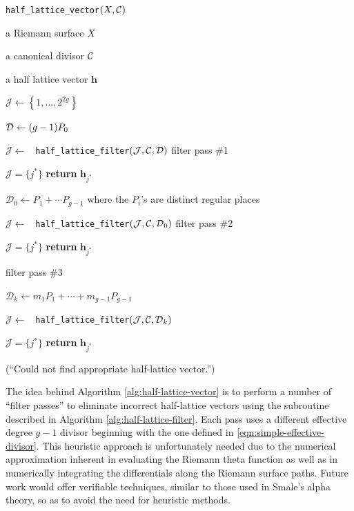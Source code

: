 \begin{algorithm}[t]
\caption{{\tt half\_lattice\_vector}$(X,\operatorname{\mathcal{C}})$}
\label{alg:half-lattice-vector}
\begin{algorithmic}[1]

\Require a Riemann surface $X$

\Require a canonical divisor $\operatorname{\mathcal{C}}$

\Ensure a half lattice vector $\boldsymbol{h}$

\State $\mathcal{J} \gets \left\{ 1, \ldots, 2^{2g} \right\}$

\State $\operatorname{\mathcal{D}} \gets (g-1)P_0$

\State $\mathcal{J} \gets$ {\tt
  half\_lattice\_filter}$(\mathcal{J},\operatorname{\mathcal{C}},\operatorname{\mathcal{D}})$ \Comment filter pass \#1

 $\mathcal{J} = \{j^*\}$ {\bf return} $\boldsymbol{h}_{j^*}$

\State $\mathcal{D}_0 \gets P_1 + \cdots P_{g-1}$ where the $P_i$'s are
distinct regular places

\State $\mathcal{J} \gets$ {\tt
  half\_lattice\_filter}$(\mathcal{J},\operatorname{\mathcal{C}},\operatorname{\mathcal{D}}_0)$ \Comment filter pass \#2

 $\mathcal{J} = \{j^*\}$ {\bf return} $\boldsymbol{h}_{j^*}$

 \Comment filter pass \#3

    \State $\mathcal{D}_k \gets m_1P_1 + \cdots + m_{g-1}P_{g-1}$

    \State $\mathcal{J} \gets$ {\tt
      half\_lattice\_filter}$(\mathcal{J},\operatorname{\mathcal{C}},\operatorname{\mathcal{D}}_k)$

     $\mathcal{J} = \{j^*\}$ {\bf return}
    $\boldsymbol{h}_{j^*}$

\EndFor


(``Could not find appropriate half-lattice vector.'')


\end{algorithmic}
\end{algorithm}



The idea behind Algorithm \ref{alg:half-lattice-vector} is to perform a number
of ``filter passes'' to eliminate incorrect half-lattice vectors using the
subroutine described in Algorithm \ref{alg:half-lattice-filter}. Each pass uses
a different effective degree $g-1$ divisor beginning with the one defined in
\eqref{eqn:simple-effective-divisor}. This heuristic approach is unfortunately
needed due to the numerical approximation inherent in evaluating the Riemann
theta function as well as in numerically integrating the differentials along the
Riemann surface paths. Future work would offer verifiable techniques, similar to
those used in Smale's alpha theory, so as to avoid the need for heuristic
methods.



